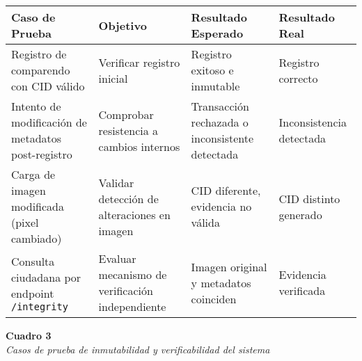 \begin{center}
\begin{tabular}{|p{4cm}|p{3cm}|p{3cm}|p{3cm}|}
    \hline
    \textbf{Caso de Prueba} & \textbf{Objetivo} & \textbf{Resultado Esperado} & \textbf{Resultado Real} \\
    \hline
    Registro de comparendo con CID válido & Verificar registro inicial & Registro exitoso e inmutable & Registro correcto \\
    \hline
    Intento de modificación de metadatos post-registro & Comprobar resistencia a cambios internos & Transacción rechazada o inconsistente detectada & Inconsistencia detectada \\
    \hline
    Carga de imagen modificada (pixel cambiado) & Validar detección de alteraciones en imagen & CID diferente, evidencia no válida & CID distinto generado \\
    \hline
    Consulta ciudadana por endpoint \texttt{/integrity} & Evaluar mecanismo de verificación independiente & Imagen original y metadatos coinciden & Evidencia verificada \\
    \hline
\end{tabular}

\vspace{1em}
\noindent\textbf{Cuadro 3}\\[1em]
\textit{Casos de prueba de inmutabilidad y verificabilidad del sistema}
\end{center} 